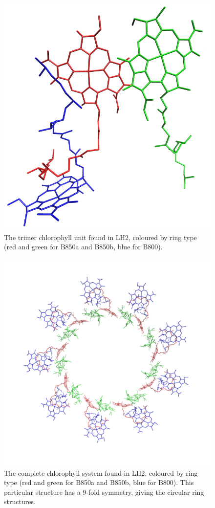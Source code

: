 \begin{figure}
	\centering 
	\includegraphics[scale=0.3]{chapters/1_introduction/subunit.png}
	\caption{The trimer chlorophyll unit found in LH2, coloured by ring type (red and green
	for B850a and B850b, blue for B800).}
	\label{fig:LH2_subunit}
\end{figure}

\begin{figure}
	\centering 
	\includegraphics[scale=0.3]{chapters/1_introduction/ring_assign.png}
	\caption{The complete chlorophyll system found in LH2, coloured by ring type
	(red and green for B850a and B850b, blue for B800). This particular structure 
	has a 9-fold symmetry, giving the circular ring structures.}
	\label{fig:LH2_rings}
\end{figure}

